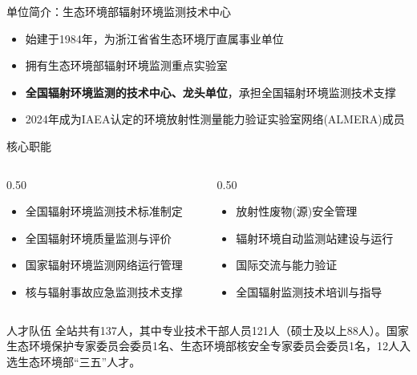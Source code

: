 \documentclass[10pt,aspectratio=169]{beamer}
\newenvironment{tightitemize}{\begin{itemize}\setlength{\itemsep}{2pt}\setlength{\parskip}{0pt}\setlength{\parsep}{0pt}}{\end{itemize}}
\begin{document}
\begin{frame}{单位简介：生态环境部辐射环境监测技术中心}
  \small
    \begin{tightitemize}
      \item 始建于1984年，为浙江省省生态环境厅直属事业单位
	\item 拥有生态环境部辐射环境监测重点实验室
      \item \textbf{全国辐射环境监测的技术中心、龙头单位}，承担全国辐射环境监测技术支撑
      \item 2024年成为IAEA认定的\textcolor{accent}{环境放射性测量能力验证实验室网络(ALMERA)}成员
    \end{tightitemize}
  \begin{block}{\small 核心职能}
    \begin{columns}
      \begin{column}{0.50\textwidth}
        \begin{tightitemize}
	\scriptsize
          \item 全国辐射环境监测技术标准制定
          \item 全国辐射环境质量监测与评价
          \item 国家辐射环境监测网络运行管理
          \item 核与辐射事故应急监测技术支撑
        \end{tightitemize}
      \end{column}
      \begin{column}{0.50\textwidth}
	\scriptsize
        \begin{tightitemize}
          \item 放射性废物(源)安全管理
          \item 辐射环境自动监测站建设与运行
          \item 国际交流与能力验证
          \item 全国辐射监测技术培训与指导
        \end{tightitemize}
      \end{column}
    \end{columns}
  \end{block}
  \begin{block}{\small 人才队伍}
全站共有137人，其中专业技术干部人员121人（硕士及以上88人）。国家生态环境保护专家委员会委员1名、生态环境部核安全专家委员会委员1名，12人入选生态环境部“三五”人才。
  \end{block}
\end{frame}
\end{document}
